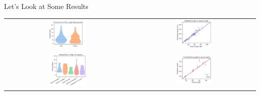 \begin{frame}{Let's Look at Some Results}
    \centering
    \begin{tabular}{@{}cc@{}}
        \includegraphics[width=0.3\textwidth]{images/device_error.pdf} &
        \includegraphics[width=0.3\textwidth]{images/fsm_all_scatter.pdf} \\
        \includegraphics[width=0.3\textwidth]{images/top_species_error.pdf} &
        \includegraphics[width=0.3\textwidth]{images/fsm_ft_scatter.pdf} \\
    \end{tabular}
\end{frame}

